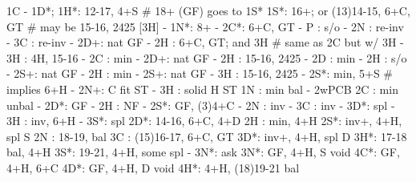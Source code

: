 1C - 1D*;
1H*: 12-17, 4+S  # 18+ (GF) goes to 1S*
1S*: 16+; or (13)14-15, 6+C, GT  # may be 15-16, 2425 [3H]
   - 1N*: 8+
        - 2C*: 6+C, GT
             - P  : s/o
             - 2N : re-inv
             - 3C : re-inv
        - 2D+: nat GF
        - 2H : 6+C, GT; and 3H  # same as 2C but w/ 3H
        - 3H : 4H, 15-16
   - 2C : min
        - 2D+: nat GF
        - 2H : 15-16, 2425
   - 2D : min
        - 2H : s/o
        - 2S+: nat GF
   - 2H : min
        - 2S+: nat GF
        - 3H : 15-16, 2425
   - 2S*: min, 5+S  # implies 6+H
   - 2N+: C fit ST
   - 3H : solid H ST
1N : min bal
   - 2wPCB
2C : min unbal
   - 2D*: GF
   - 2H : NF
   - 2S*: GF, (3)4+C
   - 2N : inv
   - 3C : inv
   - 3D*: spl
   - 3H : inv, 6+H
   - 3S*: spl
2D*: 14-16, 6+C, 4+D
2H : min, 4+H
2S*: inv+, 4+H, spl S
2N : 18-19, bal
3C : (15)16-17, 6+C, GT
3D*: inv+, 4+H, spl D
3H*: 17-18 bal, 4+H
3S*: 19-21, 4+H, some spl
   - 3N*: ask
3N*: GF, 4+H, S void 
4C*: GF, 4+H, 6+C
4D*: GF, 4+H, D void 
4H*: 4+H, (18)19-21 bal
